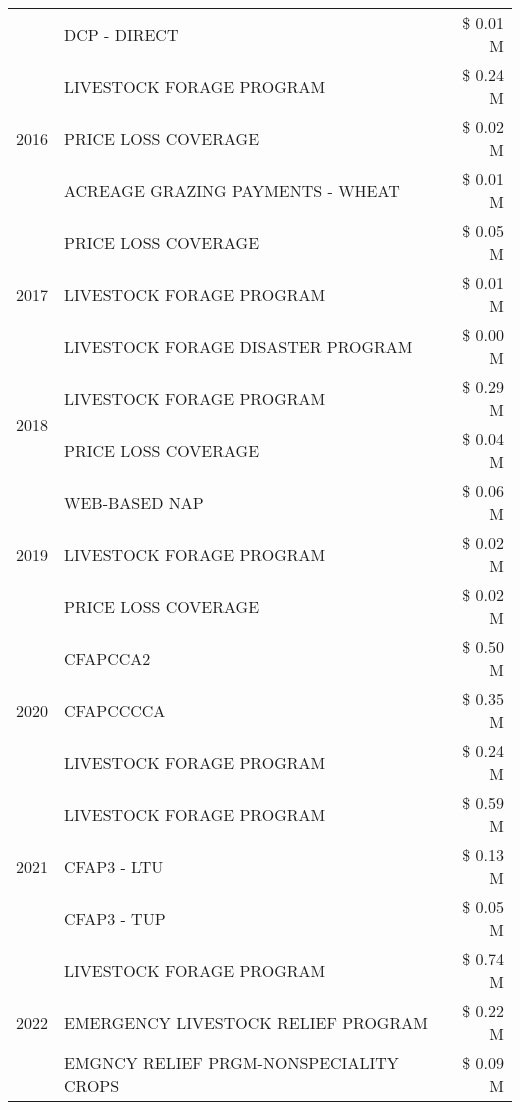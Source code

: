 \begin{tabular}{llr}
 & DCP - DIRECT & \$ 0.01 M \\
\cline{1-3}
\multirow[t]{3}{*}{2016} & LIVESTOCK FORAGE PROGRAM & \$ 0.24 M \\
 & PRICE LOSS COVERAGE & \$ 0.02 M \\
 & ACREAGE GRAZING PAYMENTS - WHEAT & \$ 0.01 M \\
\cline{1-3}
\multirow[t]{3}{*}{2017} & PRICE LOSS COVERAGE & \$ 0.05 M \\
 & LIVESTOCK FORAGE PROGRAM & \$ 0.01 M \\
 & LIVESTOCK FORAGE DISASTER PROGRAM & \$ 0.00 M \\
\cline{1-3}
\multirow[t]{2}{*}{2018} & LIVESTOCK FORAGE PROGRAM & \$ 0.29 M \\
 & PRICE LOSS COVERAGE & \$ 0.04 M \\
\cline{1-3}
\multirow[t]{3}{*}{2019} & WEB-BASED NAP & \$ 0.06 M \\
 & LIVESTOCK FORAGE PROGRAM & \$ 0.02 M \\
 & PRICE LOSS COVERAGE & \$ 0.02 M \\
\cline{1-3}
\multirow[t]{3}{*}{2020} & CFAPCCA2 & \$ 0.50 M \\
 & CFAPCCCCA & \$ 0.35 M \\
 & LIVESTOCK FORAGE PROGRAM & \$ 0.24 M \\
\cline{1-3}
\multirow[t]{3}{*}{2021} & LIVESTOCK FORAGE PROGRAM & \$ 0.59 M \\
 & CFAP3 - LTU & \$ 0.13 M \\
 & CFAP3 - TUP & \$ 0.05 M \\
\cline{1-3}
\multirow[t]{3}{*}{2022} & LIVESTOCK FORAGE PROGRAM & \$ 0.74 M \\
 & EMERGENCY LIVESTOCK RELIEF PROGRAM & \$ 0.22 M \\
 & EMGNCY RELIEF PRGM-NONSPECIALITY CROPS & \$ 0.09 M \\
\cline{1-3}
\bottomrule
\end{tabular}
